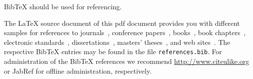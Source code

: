 \documentclass{llncs}
\begin{document}
BibTeX should be used for referencing.

The LaTeX source document of this pdf document provides you with different samples for references to journals~\cite{jour:B2BServices}, conference papers~\cite{proc:TheWebMLApproach}, books~\cite{book:umlatwork}, book chapters~\cite{incoll:ErhardKonrad1992}, electronic standards~\cite{man:BPEL}, dissertations~\cite{phdthesis:manuelWimmer}, masters' theses~\cite{mast:AUMLProfile}, and web sites~\cite{misc:BIGWebsite}. The respective BibTeX entries may be found in the file \texttt{references.bib}. For administration of the BibTeX references we recommend \url{http://www.citeulike.org} or JabRef for offline administration, respectively.



\end{document}
